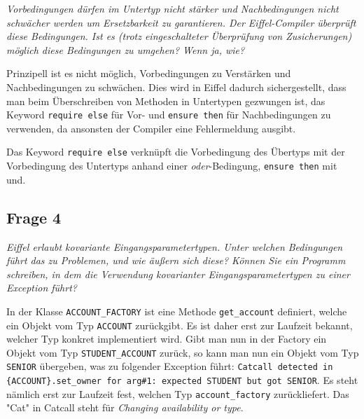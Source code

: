 \documentclass[a4paper,10pt]{article}
\begin{document}
\emph{Vorbedingungen dürfen im Untertyp nicht stärker und Nachbedingungen nicht 
schwächer werden um Ersetzbarkeit zu garantieren. Der Eiffel-Compiler überprüft 
diese Bedingungen. Ist es (trotz eingeschalteter Überprüfung von Zusicherungen) 
möglich diese Bedingungen zu umgehen? Wenn ja, wie?}

\vspace{3mm}


Prinzipell ist es nicht möglich, Vorbedingungen zu Verstärken und Nachbedingungen zu schwächen. Dies wird in Eiffel dadurch sichergestellt, dass man beim Überschreiben von Methoden in Untertypen gezwungen ist, das Keyword \verb+require else+ für Vor- und \verb+ensure then+ für Nachbedingungen zu verwenden, da ansonsten der Compiler eine Fehlermeldung ausgibt.

Das Keyword \verb+require else+ verknüpft die Vorbedingung des Übertyps mit der Vorbedingung des Untertyps anhand einer \textit{oder}-Bedingung, \lstinline|ensure then| mit und.



\subsection{Frage 4}

\emph{Eiffel erlaubt kovariante Eingangsparametertypen. Unter welchen Bedingungen 
führt das zu Problemen, und wie äußern sich diese? Können Sie ein Programm 
schreiben, in dem die Verwendung kovarianter Eingangsparametertypen zu einer 
Exception führt?}

\vspace{3mm}


\begin{comment}
See http://docs.eiffel.com/book/method/et-inheritance#Covariance.2C_anchored_declarations.2C_and_.22catcalls.22
\end{comment}

In der Klasse \lstinline|ACCOUNT_FACTORY| ist eine Methode \lstinline|get_account| definiert, welche ein Objekt vom Typ \lstinline|ACCOUNT| zurückgibt. Es ist daher erst zur Laufzeit bekannt, welcher Typ konkret implementiert wird. Gibt man nun in der Factory ein Objekt vom Typ \lstinline|STUDENT_ACCOUNT| zurück, so kann man nun ein Objekt vom Typ \lstinline|SENIOR| übergeben, was zu folgender Exception führt: \lstinline|Catcall detected in {ACCOUNT}.set_owner for arg#1: expected STUDENT but got SENIOR|. Es steht nämlich erst zur Laufzeit fest, welchen Typ \lstinline|account_factory| zurückliefert. Das "Cat" in Catcall steht für \textit{Changing availability or type}.
\end{document}
